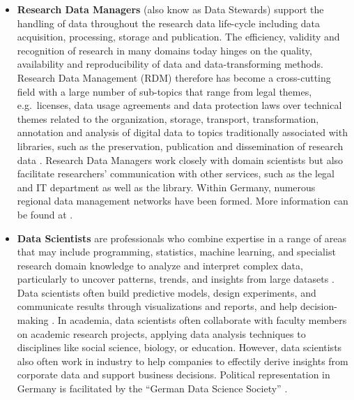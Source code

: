 \documentclass[
        english,biblatex
    ]{lni}
\begin{document}
    \begin{itemize}
    \item
      \textbf{Research Data Managers} (also know as Data Stewards)
      support the handling of data throughout the research data
      life-cycle including data acquisition, processing, storage and
      publication. The efficiency, validity and recognition of research
      in many domains today hinges on the quality, availability and
      reproducibility of data and data-transforming methods. Research
      Data Management (RDM) therefore has become a cross-cutting field
      with a large number of sub-topics that range from legal themes,
      e.g.~licenses, data usage agreements and data protection laws over
      technical themes related to the organization, storage, transport,
      transformation, annotation and analysis of digital data to topics
      traditionally associated with libraries, such as the preservation,
      publication and dissemination of research data
      \cite{https://doi.org/10.31263/voebm.v74i1.6255, https://doi.org/10.5281/zenodo.4320504}.
      Research Data Managers work closely with domain scientists but
      also facilitate researchers' communication with other services,
      such as the legal and IT department as well as the library. Within
      Germany, numerous regional data management networks have been
      formed. More information can be found at \cite{fdminfo}.
    \item
      \textbf{Data Scientists} are professionals who combine expertise
      in a range of areas that may include programming, statistics,
      machine learning, and specialist research domain knowledge to
      analyze and interpret complex data, particularly to uncover
      patterns, trends, and insights from large datasets
      \autocite{Steinmann2021Verzahnung}. Data scientists often build
      predictive models, design experiments, and communicate results
      through visualizations and reports, and help decision-making
      \autocite{George2016Big}. In academia, data scientists often
      collaborate with faculty members on academic research projects,
      applying data analysis techniques to disciplines like social
      science, biology, or education. However, data scientists also
      often work in industry to help companies to effectily derive
      insights from corporate data and support business decisions.
      Political representation in Germany is facilitated by the ``German
      Data Science Society'' \autocite{gds}.
    \end{itemize}
\end{document}
